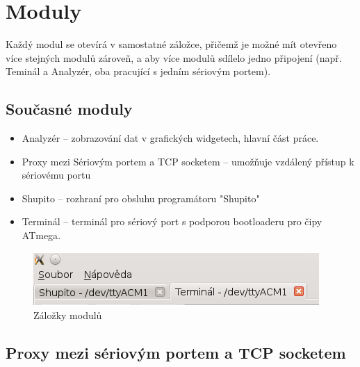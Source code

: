\documentclass[12pt, a4paper, oneside]{article}
\begin{document}
\newpage
\setlength{\voffset}{0mm} %
\pagestyle{plain}

\section*{Moduly}
Každý modul se otevírá v samostatné záložce, přičemž je možné mít otevřeno více stejných modulů zároveň, a aby více modulů sdílelo jedno připojení (např. Teminál a Analyzér, oba pracující s jedním sériovým portem).
\subsection*{Současné moduly}
    \begin{itemize}
        \item Analyzér -- zobrazování dat v grafických widgetech, hlavní část práce.
        \item Proxy mezi Sériovým portem a TCP socketem -- umožňuje vzdálený přístup k sériovému portu
        \item Shupito -- rozhraní pro obsluhu programátoru "Shupito"\cite{shupito}
        \item Terminál -- terminál pro sériový port s podporou bootloaderu pro čipy ATmega\cite{avr232client}.
    \end{itemize}
\begin{figure}[h]
\begin{center}
\includegraphics{img/tabs.png}
\caption{Záložky modulů}
\label{Moduly}
\end{center}
\end{figure}



\newpage
\setlength{\voffset}{0mm} %
\pagestyle{plain}

\subsection*{Proxy mezi sériovým portem a TCP socketem}
\end{document}
